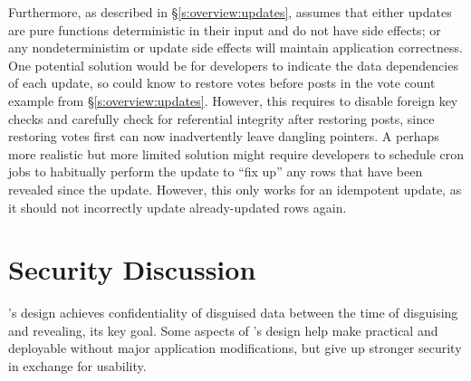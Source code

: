 %
Furthermore, as described in \S\ref{s:overview:updates}, \sys assumes that
either \one{} updates are pure functions deterministic in their input and do not
have side effects; or \two{} any nondeterministim or update side effects will
maintain application correctness.
%
One potential solution would be for developers to indicate the data dependencies
of each update, so \sys could know to \eg restore votes before posts in the
vote count example from \S\ref{s:overview:updates}. However, this
requires \sys to disable foreign key checks and carefully check for referential
integrity after restoring posts, since restoring votes first can now
inadvertently leave dangling pointers. 
%
A perhaps more realistic but more limited solution might require developers to
schedule cron jobs to habitually perform the update to ``fix up'' any rows that
have been revealed since the update. However, this only works for an idempotent
update, as it should not incorrectly update already-updated rows again.  
%


\section{Security Discussion}
\label{s:eval-security}

%
%
\sys's design achieves confidentiality of disguised data between the time of
disguising and revealing, its key goal.
%
Some aspects of \sys's design help make \sys practical and deployable without
major application modifications, but give up stronger security in exchange for
usability.
%

